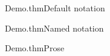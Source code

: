 \begin{leantheorem}{Demo.thm}{Default notation}
\end{leantheorem}
\begin{leantheorem}[notation=named]{Demo.thm}{Named notation}
\end{leantheorem}
\begin{leanblock}[view=prose]{Demo.thm}{Prose}
\end{leanblock}
